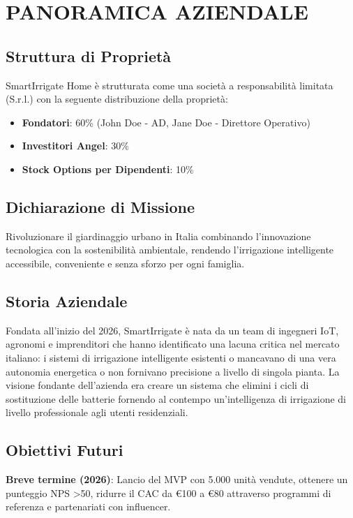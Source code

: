 \documentclass[11pt,a4paper]{report}
\begin{document}
\chapter{PANORAMICA AZIENDALE}

\section{Struttura di Proprietà}
SmartIrrigate Home è strutturata come una società a responsabilità limitata (S.r.l.) con la seguente distribuzione della proprietà:
\begin{itemize}
    \item \textbf{Fondatori}: 60\% (John Doe - AD, Jane Doe - Direttore Operativo)
    \item \textbf{Investitori Angel}: 30\%
    \item \textbf{Stock Options per Dipendenti}: 10\%
\end{itemize}

\section{Dichiarazione di Missione}
Rivoluzionare il giardinaggio urbano in Italia combinando l'innovazione tecnologica con la sostenibilità ambientale, rendendo l'irrigazione intelligente accessibile, conveniente e senza sforzo per ogni famiglia.

\section{Storia Aziendale}
Fondata all'inizio del 2026, SmartIrrigate è nata da un team di ingegneri IoT, agronomi e imprenditori che hanno identificato una lacuna critica nel mercato italiano: i sistemi di irrigazione intelligente esistenti o mancavano di una vera autonomia energetica o non fornivano precisione a livello di singola pianta. La visione fondante dell'azienda era creare un sistema che elimini i cicli di sostituzione delle batterie fornendo al contempo un'intelligenza di irrigazione di livello professionale agli utenti residenziali.

\section{Obiettivi Futuri}
\textbf{Breve termine (2026)}: Lancio del MVP con 5.000 unità vendute, ottenere un punteggio NPS >50, ridurre il CAC da €100 a €80 attraverso programmi di referenza e partenariati con influencer.
\end{document}
